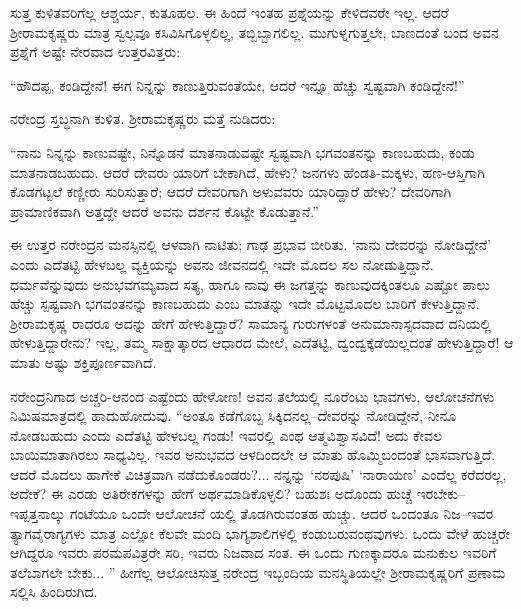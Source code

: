 ಸುತ್ತ ಕುಳಿತವರಿಗೆಲ್ಲ ಆಶ್ಚರ್ಯ, ಕುತೂಹಲ. ಈ ಹಿಂದೆ ಇಂತಹ ಪ್ರಶ್ನೆಯನ್ನು ಕೇಳಿದವರೇ ಇಲ್ಲ. ಆದರೆ ಶ್ರೀರಾಮಕೃಷ್ಣರು ಮಾತ್ರ ಸ್ವಲ್ಪವೂ ಕಸಿವಿಸಿಗೊಳ್ಳಲಿಲ್ಲ, ತಬ್ಬಿಬ್ಬಾಗಲಿಲ್ಲ. ಮುಗುಳ್ನಗುತ್ತಲೇ, ಬಾಣದಂತೆ ಬಂದ ಅವನ ಪ್ರಶ್ನೆಗೆ ಅಷ್ಟೇ ನೇರವಾದ ಉತ್ತರವಿತ್ತರು:

“ಹೌದಪ್ಪ, ಕಂಡಿದ್ದೇನೆ! ಈಗ ನಿನ್ನನ್ನು ಕಾಣುತ್ತಿರುವಂತೆಯೇ, ಆದರೆ ಇನ್ನೂ ಹೆಚ್ಚು ಸ್ವಷ್ಟವಾಗಿ ಕಂಡಿದ್ದೇನೆ!”

ನರೇಂದ್ರ ಸ್ತಬ್ಧನಾಗಿ ಕುಳಿತ. ಶ್ರೀರಾಮಕೃಷ್ಣರು ಮತ್ತೆ ನುಡಿದರು:

“ನಾನು ನಿನ್ನನ್ನು ಕಾಣುವಷ್ಟೇ, ನಿನ್ನೊಡನೆ ಮಾತನಾಡುವಷ್ಟೇ ಸ್ವಷ್ಟವಾಗಿ ಭಗವಂತನನ್ನು ಕಾಣಬಹುದು, ಕಂಡು ಮಾತನಾಡಬಹುದು. ಆದರೆ ದೇವರು ಯಾರಿಗೆ ಬೇಕಾಗಿದೆ, ಹೇಳು? ಜನಗಳು ಹೆಂಡತಿ-ಮಕ್ಕಳು, ಹಣ-ಆಸ್ತಿಗಾಗಿ ಕೊಡಗಟ್ಟಲೆ ಕಣ್ಣೀರು ಸುರಿಸುತ್ತಾರೆ; ಆದರೆ ದೇವರಿಗಾಗಿ ಅಳುವವರು ಯಾರಿದ್ದಾರೆ ಹೇಳು? ದೇವರಿಗಾಗಿ ಪ್ರಾಮಾಣಿಕವಾಗಿ ಅತ್ತದ್ದೇ ಆದರೆ ಅವನು ದರ್ಶನ ಕೊಟ್ಟೇ ಕೊಡುತ್ತಾನೆ.”

ಈ ಉತ್ತರ ನರೇಂದ್ರನ ಮನಸ್ಸಿನಲ್ಲಿ ಆಳವಾಗಿ ನಾಟಿತು; ಗಾಢ ಪ್ರಭಾವ ಬೀರಿತು. ‘ನಾನು ದೇವರನ್ನು ನೋಡಿದ್ದೇನೆ’ ಎಂದು ಎದೆತಟ್ಟಿ ಹೇಳಬಲ್ಲ ವ್ಯಕ್ತಿಯನ್ನು ಅವನು ಜೀವನದಲ್ಲಿ ಇದೇ ಮೊದಲ ಸಲ ನೋಡುತ್ತಿದ್ದಾನೆ. ಧರ್ಮವೆನ್ನುವುದು ಅನುಭವಗಮ್ಯವಾದ ಸತ್ಯ, ಹಾಗೂ ನಾವು ಈ ಜಗತ್ತನ್ನು ಕಾಣುವುದಕ್ಕಿಂತಲೂ ಎಷ್ಟೋ ಪಾಲು ಹೆಚ್ಚು ಸ್ಪಷ್ಟವಾಗಿ ಭಗವಂತನನ್ನು ಕಾಣಬಹುದು ಎಂಬ ಮಾತನ್ನು ಇದೇ ಮೊಟ್ಟಮೊದಲ ಬಾರಿಗೆ ಕೇಳುತ್ತಿದ್ದಾನೆ. ಶ್ರೀರಾಮಕೃಷ್ಣ ರಾದರೂ ಅದನ್ನು ಹೇಗೆ ಹೇಳುತ್ತಿದ್ದಾರೆ? ಸಾಮಾನ್ಯ ಗುರುಗಳಂತೆ ಅನುಮಾನಾಸ್ಪದವಾದ ದನಿಯಲ್ಲಿ ಹೇಳುತ್ತಿದ್ದಾರೇನು? ಇಲ್ಲ, ತಮ್ಮ ಸಾಕ್ಷಾತ್ಕಾರದ ಆಧಾರದ ಮೇಲೆ, ಎದೆತಟ್ಟಿ, ದ್ವಂದ್ವಕ್ಕೆಡೆಯಿಲ್ಲದಂತೆ ಹೇಳುತ್ತಿದ್ದಾರೆ! ಆ ಮಾತು ಅಷ್ಟು ಶಕ್ತಿಪೂರ್ಣವಾಗಿದೆ.

ನರೇಂದ್ರನಿಗಾದ ಅಚ್ಚರಿ-ಆನಂದ ಎಷ್ಟೆಂದು ಹೇಳೋಣ! ಅವನ ತಲೆಯಲ್ಲಿ ನೂರೆಂಟು ಭಾವಗಳು, ಆಲೋಚನೆಗಳು ನಿಮಿಷಮಾತ್ರದಲ್ಲಿ ಹಾದುಹೋದುವು. “ಅಂತೂ ಕಡೆಗೊಬ್ಬ ಸಿಕ್ಕಿದನಲ್ಲ–ದೇವರನ್ನು ನೋಡಿದ್ದೇನೆ, ನೀನೂ ನೋಡಬಹುದು ಎಂದು ಎದೆತಟ್ಟಿ ಹೇಳಬಲ್ಲ ಗಂಡು! ಇವರಲ್ಲಿ ಎಂಥ ಆತ್ಮವಿಶ್ವಾಸವಿದೆ! ಅದು ಕೇವಲ ಬಾಯಿಮಾತಾಗಿರಲು ಸಾಧ್ಯವಿಲ್ಲ. ಇವರ ಅನುಭವದ ಆಳದಿಂದಲೇ ಆ ಮಾತು ಹೊಮ್ಮಿಬಂದಂತೆ ಭಾಸವಾಗುತ್ತಿದೆ. ಆದರೆ ಮೊದಲು ಹಾಗೇಕೆ ವಿಚಿತ್ರವಾಗಿ ನಡೆದುಕೊಂಡರು?... ನನ್ನನ್ನು ‘ನರಪುಷಿ’ ‘ನಾರಾಯಣ’ ಎಂದೆಲ್ಲ ಕರೆದರಲ್ಲ, ಅದೇಕೆ? ಈ ಎರಡು ಅತಿರೇಕಗಳನ್ನು ಹೇಗೆ ಅರ್ಥಮಾಡಿಕೊಳ್ಳಲಿ? ಬಹುಶಃ ಅದೊಂದು ಹುಚ್ಚೆ ಇರಬೇಕು–ಇಪ್ಪತ್ತನಾಲ್ಕು ಗಂಟೆಯೂ ಒಂದೇ ಆಲೋಚನೆ ಯಲ್ಲಿ ತೊಡಗಿರುವಂತಹ ಹುಚ್ಚು. ಆದರೆ ಒಂದಂತೂ ನಿಜ–ಇವರ ತ್ಯಾಗವೈರಾಗ್ಯಗಳು ಮಾತ್ರ ಎಲ್ಲೋ ಕೆಲವೇ ಮಂದಿ ಭಾಗ್ಯಶಾಲಿಗಳಲ್ಲಿ ಕಂಡುಬರುವಂಥವುಗಳು. ಒಂದು ವೇಳೆ ಹುಚ್ಚರೇ ಆಗಿದ್ದರೂ ಇವರು ಪರಮಪವಿತ್ರರೇ ಸರಿ, ಇವರು ನಿಜವಾದ ಸಂತ. ಈ ಒಂದು ಗುಣಕ್ಕಾದರೂ ಮನುಕುಲ ಇವರಿಗೆ ತಲೆಬಾಗಲೇ ಬೇಕು... ” ಹೀಗೆಲ್ಲ ಆಲೋಚಿಸುತ್ತ ನರೇಂದ್ರ ಇಬ್ಬಂದಿಯ ಮನಸ್ಥಿತಿಯಲ್ಲೇ ಶ್ರೀರಾಮಕೃಷ್ಣರಿಗೆ ಪ್ರಣಾಮ ಸಲ್ಲಿಸಿ ಹಿಂದಿರುಗಿದ.


